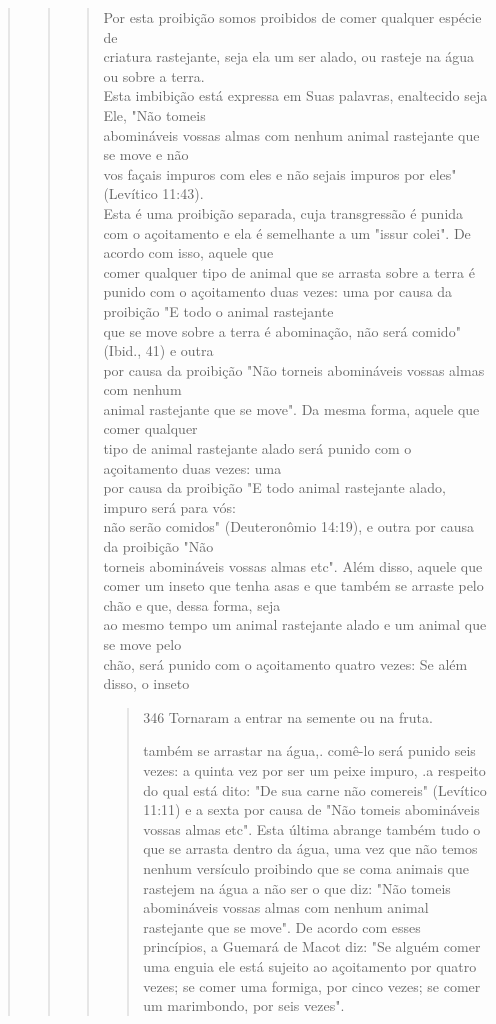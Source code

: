 \begin{quote}
\begin{quote}
\begin{quote}
Por esta proibição somos proibidos de comer qualquer espécie de\\
criatura rastejante, seja ela um ser alado, ou rasteje na água ou sobre
a terra.\\
Esta imbibição está expressa em Suas palavras, enaltecido seja Ele, "Não
tomeis\\
abomináveis vossas almas com nenhum animal rastejante que se move e
não\\
vos façais impuros com eles e não sejais impuros por eles" (Levítico
11:43).\\
Esta é uma proibição separada, cuja transgressão é punida com o açoitamento
e ela é semelhante a um "issur colei". De acordo com isso,
aquele que\\
comer qualquer tipo de animal que se arrasta sobre a terra é punido com
o açoitamento
duas vezes: uma por causa da proibição "E todo o animal
rastejante\\
que se move sobre a terra é abominação, não será comido" (Ibid., 41) e
outra\\
por causa da proibição "Não torneis abomináveis vossas almas com
nenhum\\
animal rastejante que se move". Da mesma forma, aquele que comer
qualquer\\
tipo de animal rastejante alado será punido com o açoitamento duas
vezes: uma\\
por causa da proibição "E todo animal rastejante alado, impuro será para
vós:\\
não serão comidos" (Deuteronômio 14:19), e outra por causa da proibição
"Não\\
torneis abomináveis vossas almas etc". Além disso, aquele que comer um
inseto
que tenha asas e que também se arraste pelo chão e que, dessa forma,
seja\\
ao mesmo tempo um animal rastejante alado e um animal que se move pelo\\
chão, será punido com o açoitamento quatro vezes: Se além disso, o
inseto

\begin{quote}
346 Tornaram a entrar na semente ou na fruta.


também se arrastar na água,. comê-lo será punido seis vezes: a quinta
vez por ser um peixe impuro, .a respeito do qual está dito: "De sua
carne não come­reis" (Levítico 11:11) e a sexta por causa de "Não tomeis
abomináveis vossas almas etc". Esta última abrange também tudo o que se
arrasta dentro da água, uma vez que não temos nenhum versículo proibindo
que se coma animais que rastejem na água a não ser o que diz: "Não
tomeis abomináveis vossas almas com nenhum animal rastejante que se
move". De acordo com esses princípios, a Guemará de Macot diz: "Se
alguém comer uma enguia ele está sujeito ao açoi­tamento por quatro
vezes; se comer uma formiga, por cinco vezes; se comer um marimbondo,
por seis vezes".


\end{quote}
\end{quote}
\end{quote}
\end{quote}
